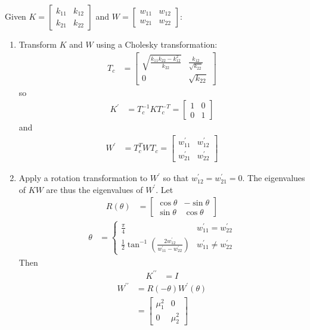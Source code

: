 \documentclass[a4paper,twoside,10pt,english]{report}
\begin{document}
\begin{algorithm}[!htpb]
Given $K=\left[\begin{array}{cc}
k_{11} & k_{12}\\
k_{21} & k_{22}
\end{array}\right]$ and $W=\left[\begin{array}{cc}
w_{11} & w_{12}\\
w_{21} & w_{22}
\end{array}\right]$:
\begin{enumerate}
\item Transform $K$ and $W$ using a Cholesky transformation:
\begin{align*}
T_{c} & =  \left[\begin{array}{cc}
\sqrt{\frac{k_{11}k_{22}-k_{12}^{2}}{k_{22}}} & \frac{k_{12}}{\sqrt{k_{22}}}\\
0 & \sqrt{k_{22}}
\end{array}\right]
\end{align*}
 so 
\begin{align*}
K^{\prime} & =  T_{c}^{-1}KT_{c}^{-T}=\left[\begin{array}{cc}
1 & 0\\
0 & 1
\end{array}\right]
\end{align*}
 and 
\begin{align*}
W^{\prime} & =  T_{c}^{T}WT_{c}=\left[\begin{array}{cc}
w_{11}^{\prime} & w_{12}^{\prime}\\
w_{21}^{\prime} & w_{22}^{\prime}
\end{array}\right]
\end{align*}

\item Apply a rotation transformation to $W^{\prime}$ so that 
$w_{12}^{\prime}=w_{21}^{\prime}=0$.
The eigenvalues of $KW$ are thus the eigenvalues of $W^{\prime}$.
Let 
\begin{align*}
R(\theta) & = \left[\begin{array}{cc}
\cos\theta & -\sin\theta\\
\sin\theta & \cos\theta
\end{array}\right]
\end{align*}
\begin{align*}
\theta & = \begin{cases}
\frac{\pi}{4} & w_{11}^{\prime}=w_{22}^{\prime}\\
\frac{1}{2}\tan^{-1}\left(\frac{2w_{12}^{\prime}}{w_{11}^{\prime}-w_{22}^{\prime}}\right) & w_{11}^{\prime}\neq w_{22}^{\prime}
\end{cases}
\end{align*}
 Then
\begin{align*}
K^{\prime\prime} & =  I
\end{align*}
\begin{align*}
W^{\prime\prime} & =  R\left(-\theta\right)W^{\prime}\left(\theta\right)\\
 & =  \left[\begin{array}{cc}
\mu_{1}^{2} & 0\\
0 & \mu_{2}^{2}
\end{array}\right]
\end{align*}


\end{enumerate}
\end{algorithm}
\end{document}
